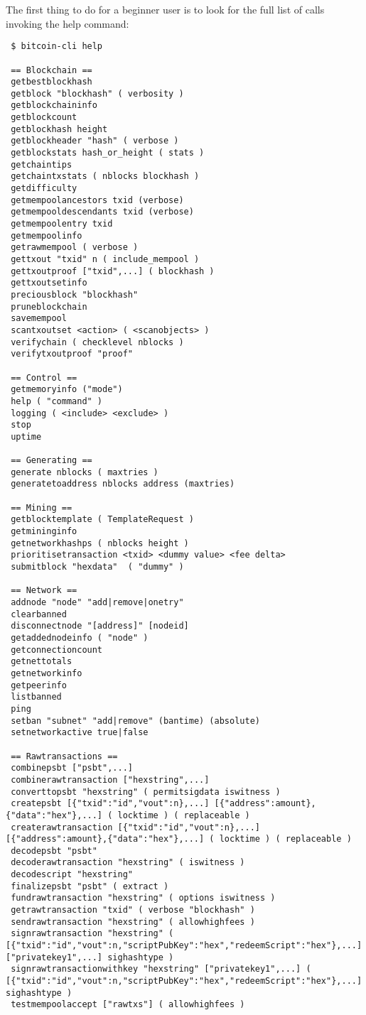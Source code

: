 \bigskip
\noindent
The first thing to do for a beginner user is to look for the full list of calls invoking the \colorbox{Grey!10}{help} command:
\bigskip
\begin{lstlisting}
 $ bitcoin-cli help
 
 == Blockchain ==
 getbestblockhash
 getblock "blockhash" ( verbosity ) 
 getblockchaininfo
 getblockcount
 getblockhash height
 getblockheader "hash" ( verbose )
 getblockstats hash_or_height ( stats )
 getchaintips
 getchaintxstats ( nblocks blockhash )
 getdifficulty
 getmempoolancestors txid (verbose)
 getmempooldescendants txid (verbose)
 getmempoolentry txid
 getmempoolinfo
 getrawmempool ( verbose )
 gettxout "txid" n ( include_mempool )
 gettxoutproof ["txid",...] ( blockhash )
 gettxoutsetinfo
 preciousblock "blockhash"
 pruneblockchain
 savemempool
 scantxoutset <action> ( <scanobjects> )
 verifychain ( checklevel nblocks )
 verifytxoutproof "proof"

 == Control ==
 getmemoryinfo ("mode")
 help ( "command" )
 logging ( <include> <exclude> )
 stop
 uptime

 == Generating ==
 generate nblocks ( maxtries )
 generatetoaddress nblocks address (maxtries)

 == Mining ==
 getblocktemplate ( TemplateRequest )
 getmininginfo
 getnetworkhashps ( nblocks height )
 prioritisetransaction <txid> <dummy value> <fee delta>
 submitblock "hexdata"  ( "dummy" )

 == Network ==
 addnode "node" "add|remove|onetry"
 clearbanned
 disconnectnode "[address]" [nodeid]
 getaddednodeinfo ( "node" )
 getconnectioncount
 getnettotals
 getnetworkinfo
 getpeerinfo
 listbanned
 ping
 setban "subnet" "add|remove" (bantime) (absolute)
 setnetworkactive true|false

 == Rawtransactions ==
 combinepsbt ["psbt",...]
 combinerawtransaction ["hexstring",...]
 converttopsbt "hexstring" ( permitsigdata iswitness )
 createpsbt [{"txid":"id","vout":n},...] [{"address":amount},{"data":"hex"},...] ( locktime ) ( replaceable )
 createrawtransaction [{"txid":"id","vout":n},...] [{"address":amount},{"data":"hex"},...] ( locktime ) ( replaceable )
 decodepsbt "psbt"
 decoderawtransaction "hexstring" ( iswitness )
 decodescript "hexstring"
 finalizepsbt "psbt" ( extract )
 fundrawtransaction "hexstring" ( options iswitness )
 getrawtransaction "txid" ( verbose "blockhash" )
 sendrawtransaction "hexstring" ( allowhighfees )
 signrawtransaction "hexstring" ( [{"txid":"id","vout":n,"scriptPubKey":"hex","redeemScript":"hex"},...] ["privatekey1",...] sighashtype )
 signrawtransactionwithkey "hexstring" ["privatekey1",...] ( [{"txid":"id","vout":n,"scriptPubKey":"hex","redeemScript":"hex"},...] sighashtype )
 testmempoolaccept ["rawtxs"] ( allowhighfees )


\end{lstlisting}
